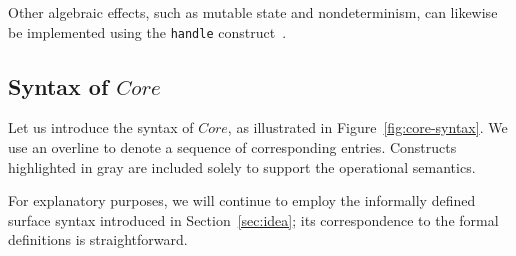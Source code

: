 \documentclass[acmsmall,review,screen]{acmart}
\newcommand{\ap}{~}
\newcommand{\keyword}[1]{\mathbf{#1}}
\begin{document}
Other algebraic effects, such as mutable state and nondeterminism, can likewise be implemented using the \texttt{handle} construct~\cite{plotkin2013handling}.


\subsection{Syntax of $Core$} \label{subsec:syntax-core}

Let us introduce the syntax of $Core$, as illustrated in Figure~\ref{fig:core-syntax}.
We use an overline to denote a sequence of corresponding entries.
Constructs highlighted in gray are included solely to support the operational semantics.

For explanatory purposes, we will continue to employ the informally defined surface syntax introduced in Section~\ref{sec:idea}; its correspondence to the formal definitions is straightforward.
\end{document}

